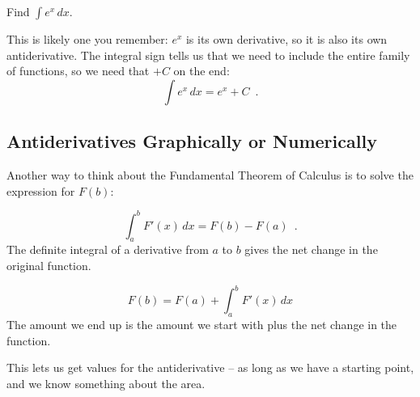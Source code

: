 \begin{example}
Find $\displaystyle\int e^x\,dx$.

\begin{solution}
This is likely one you remember: $e^x$ is its own derivative, so it is also its own antiderivative. The integral sign tells us that we need to include the entire family of functions, so we need that $+C$ on the end:
$$\int e^x\,dx = e^x+C \enspace .$$
\end{solution}\end{example}

\subsection{Antiderivatives Graphically or Numerically}
Another way to think about the Fundamental Theorem of Calculus is to solve the expression for $F(b)$:

\begin{theorem}
$$\int_a^b F'(x)\,dx = F(b)-F(a) \enspace .$$
The definite integral of a derivative from $a$ to $b$ gives the net change in the original function.

$$F(b)=F(a)+\int_a^b F'(x)\,dx$$
The amount we end up is the amount we start with plus the net change in the function.
\end{theorem}
This lets us get values for the antiderivative – as long as we have a starting point, and we know something about the area.

